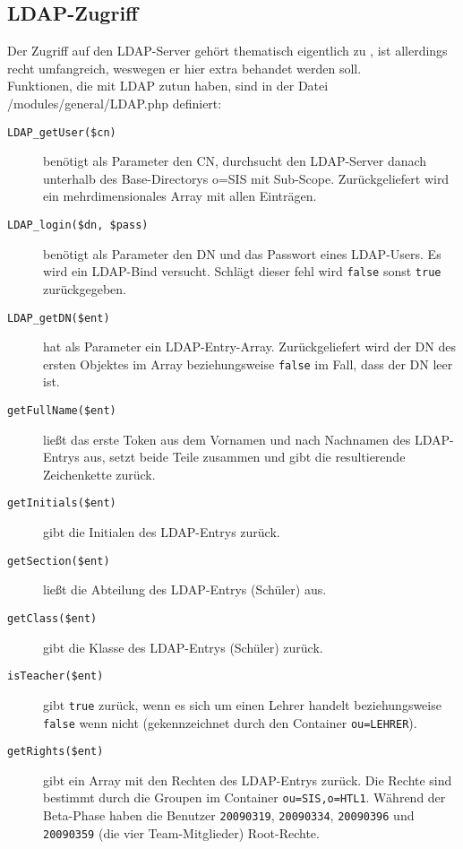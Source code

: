 \subsection{LDAP-Zugriff}
\label{sec:content_imple_ldap}
Der Zugriff auf den LDAP-Server gehört thematisch eigentlich zu , ist allerdings recht umfangreich, weswegen er hier extra behandet werden soll.\\
Funktionen, die mit LDAP zutun haben, sind in der Datei /modules/general/LDAP.php definiert:
\begin{description}
	\item[\texttt{LDAP\_getUser(\$cn)}] benötigt als Parameter den CN, durchsucht den LDAP-Server danach unterhalb des Base-Directorys o=SIS mit Sub-Scope. Zurückgeliefert wird ein mehrdimensionales Array mit allen Einträgen.
	\item[\texttt{LDAP\_login(\$dn, \$pass)}] benötigt als Parameter den DN und das Passwort eines LDAP-Users. Es wird ein LDAP-Bind versucht. Schlägt dieser fehl wird \texttt{false} sonst \texttt{true} zurückgegeben.
	\item[\texttt{LDAP\_getDN(\$ent)}] hat als Parameter ein LDAP-Entry-Array. Zurückgeliefert wird der DN des ersten Objektes im Array beziehungsweise \texttt{false} im Fall, dass der DN leer ist.
	\item[\texttt{getFullName(\$ent)}] ließt das erste Token aus dem Vornamen und nach Nachnamen  des LDAP-Entrys aus, setzt beide Teile zusammen und gibt die resultierende Zeichenkette zurück.
	\item[\texttt{getInitials(\$ent)}] gibt die Initialen des LDAP-Entrys zurück.
	\item[\texttt{getSection(\$ent)}] ließt die Abteilung des LDAP-Entrys (Schüler) aus.
	\item[\texttt{getClass(\$ent)}] gibt die Klasse des LDAP-Entrys (Schüler) zurück.
	\item[\texttt{isTeacher(\$ent)}] gibt \texttt{true} zurück, wenn es sich um einen Lehrer handelt beziehungsweise \texttt{false} wenn nicht (gekennzeichnet durch den Container \texttt{ou=LEHRER}).
	\item[\texttt{getRights(\$ent)}] gibt ein Array mit den Rechten des LDAP-Entrys zurück. Die Rechte sind bestimmt durch die Groupen im Container \texttt{ou=SIS,o=HTL1}. Während der Beta-Phase haben die Benutzer \texttt{20090319}, \texttt{20090334}, \texttt{20090396} und \texttt{20090359} (die vier Team-Mitglieder) Root-Rechte.
\end{description}

